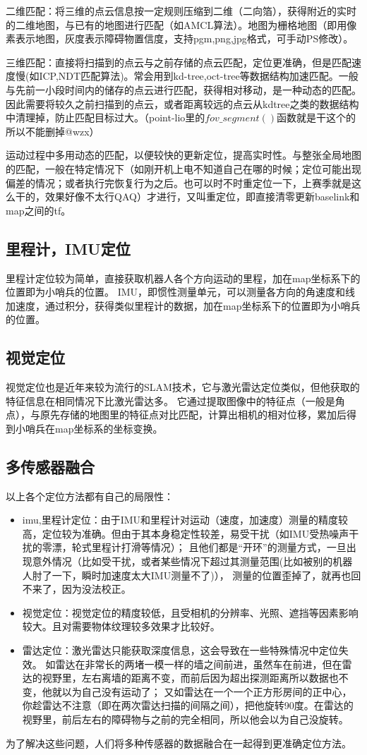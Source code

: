 二维匹配：将三维的点云信息按一定规则压缩到二维（二向箔），获得附近的实时的二维地图，与已有的地图进行匹配（如AMCL算法）。地图为栅格地图（即用像素表示地图，灰度表示障碍物置信度，支持pgm,png,jpg格式，可手动PS修改）。

三维匹配：直接将扫描到的点云与之前存储的点云匹配，定位更准确，但是匹配速度慢(如ICP,NDT匹配算法)。常会用到kd-tree,oct-tree等数据结构加速匹配。一般与先前一小段时间内的储存的点云进行匹配，获得相对移动，是一种动态的匹配。
因此需要将较久之前扫描到的点云，或者距离较远的点云从kdtree之类的数据结构中清理掉，防止匹配目标过大。（point-lio里的$fov\_segment()$函数就是干这个的所以不能删掉@wzx）

运动过程中多用动态的匹配，以便较快的更新定位，提高实时性。与整张全局地图的匹配，一般在特定情况下（如刚开机上电不知道自己在哪的时候；定位可能出现偏差的情况；或者执行完恢复行为之后。也可以时不时重定位一下，上赛季就是这么干的，效果好像不太行QAQ）才进行，又叫重定位，即直接清零更新baselink和map之间的tf。
\subsection{\quad 里程计，IMU定位}
里程计定位较为简单，直接获取机器人各个方向运动的里程，加在map坐标系下的位置即为小哨兵的位置。
IMU，即惯性测量单元，可以测量各方向的角速度和线加速度，通过积分，获得类似里程计的数据，加在map坐标系下的位置即为小哨兵的位置。

\subsection{视觉定位}
视觉定位也是近年来较为流行的SLAM技术，它与激光雷达定位类似，但他获取的特征信息在相同情况下比激光雷达多。
它通过提取图像中的特征点（一般是角点），与原先存储的地图里的特征点对比匹配，计算出相机的相对位移，累加后得到小哨兵在map坐标系的坐标变换。

\subsection{多传感器融合}
以上各个定位方法都有自己的局限性：
\begin{itemize}
\item imu,里程计定位：由于IMU和里程计对运动（速度，加速度）测量的精度较高，定位较为准确。但由于其本身稳定性较差，易受干扰（如IMU受热噪声干扰的零漂，轮式里程计打滑等情况）；
        且他们都是“开环”的测量方式，一旦出现意外情况（比如受干扰，或者某些情况下超过其测量范围(比如被别的机器人肘了一下，瞬时加速度太大IMU测量不了)），
        测量的位置歪掉了，就再也回不来了，因为没法校正。
\item 视觉定位：视觉定位的精度较低，且受相机的分辨率、光照、遮挡等因素影响较大。且对需要物体纹理较多效果才比较好。
\item 雷达定位：激光雷达只能获取深度信息，这会导致在一些特殊情况中定位失效。
        如雷达在非常长的两堵一模一样的墙之间前进，虽然车在前进，但在雷达的视野里，左右离墙的距离不变，而前后因为超出探测距离所以数据也不变，他就以为自己没有运动了；
        又如雷达在一个一个正方形房间的正中心，你趁雷达不注意（即在两次雷达扫描的间隔之间），把他旋转90度。在雷达的视野里，前后左右的障碍物与之前的完全相同，所以他会以为自己没旋转。
\end{itemize}
为了解决这些问题，人们将多种传感器的数据融合在一起得到更准确定位方法。

